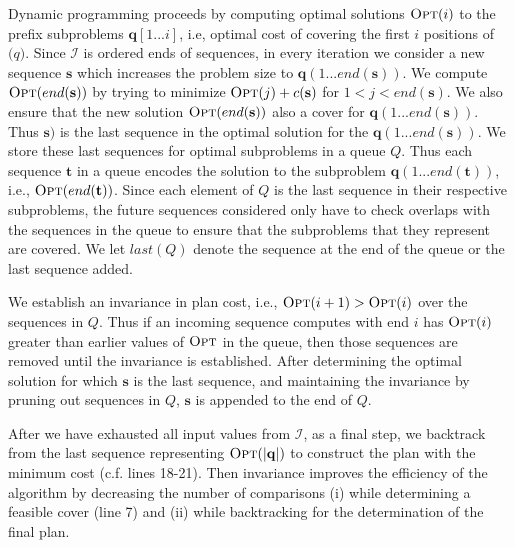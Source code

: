 Dynamic programming proceeds by computing optimal solutions $\textsc{Opt}(i)$ to the prefix subproblems $\mathbf{q}[1...i]$, i.e, optimal cost of covering the first $i$ positions of $\mathbf(q)$. Since $\mathcal{I}$ is ordered ends of sequences, in every iteration we consider a new sequence $\mathbf{s}$ which increases the problem size to $\mathbf{q}(1...end(\mathbf{s}))$. We compute $\textsc{Opt}(end(\mathbf{s}))$ by trying to minimize $\textsc{Opt}(j) + c(\mathbf{s})$ for $1<j<end(\mathbf{s})$. We also ensure that the new solution $\textsc{Opt}(end(\mathbf{s}))$ also a cover for $\mathbf{q}(1...end(\mathbf{s}))$. Thus $\mathbf{s})$ is the last sequence in the optimal solution for the $\mathbf{q}(1...end(\mathbf{s}))$. We store these last sequences for optimal subproblems in a queue $Q$. Thus each sequence $\mathbf{t}$ in a queue encodes the solution to the subproblem $\mathbf{q}(1...end(\mathbf{t}))$, i.e., $\textsc{Opt}(end(\mathbf{t}))$. Since each element of $Q$ is the last sequence in their respective subproblems, the future sequences considered only have to check overlaps with the sequences in the queue to ensure that the subproblems that they represent are covered. We let $last(Q)$ denote the sequence at the end of the queue or the last sequence added. 


We establish an invariance in plan cost, i.e., $\textsc{Opt}(i+1) > \textsc{Opt}(i)$ over the sequences in $Q$. Thus if an incoming sequence computes with end $i$ has $\textsc{Opt}(i)$ greater than earlier values of $\textsc{Opt}$ in the queue, then those sequences are removed until the invariance is established. After determining the optimal solution for which $\mathbf{s}$ is the last sequence, and maintaining the invariance by pruning out sequences in $Q$, $\mathbf{s}$ is appended to the end of $Q$.

 After we have exhausted all input values from $\mathcal{I}$, as a final step, we backtrack from the last sequence representing $\textsc{Opt}(|\mathbf{q}|)$ to construct the plan with the minimum cost (c.f. lines 18-21). Then invariance improves the efficiency of the algorithm by  decreasing the number of comparisons (i) while determining a feasible cover (line 7) and (ii) while backtracking for the determination of the final plan.


